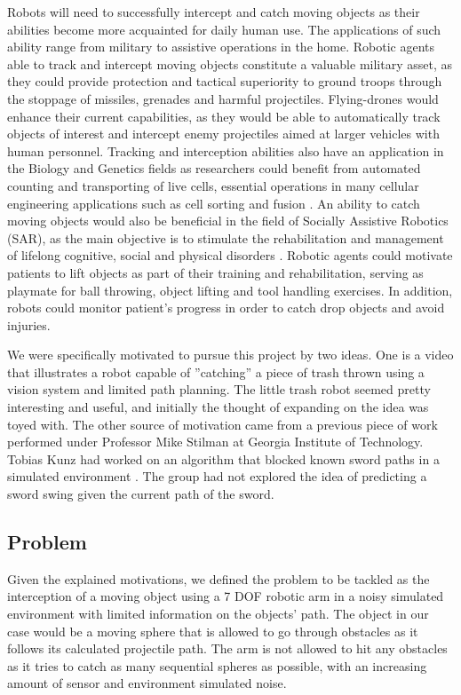 \documentclass[letterpaper, 10 pt, conference]{ieeeconf}  %
\begin{document}
Robots will need to successfully intercept and catch moving objects as their
abilities become more acquainted for daily human use. The applications of such
ability range from military to assistive operations in the home. Robotic agents
able to track and intercept moving objects constitute a valuable military
asset, as they could provide protection and tactical superiority to ground
troops through the stoppage of missiles, grenades and harmful projectiles.
Flying-drones would enhance their current capabilities, as they would be able
to automatically track objects of interest and intercept enemy projectiles
aimed at larger vehicles with human personnel.  Tracking and interception
abilities also have an application in the Biology and Genetics fields as
researchers could benefit from automated counting and transporting of live
cells, essential operations in many cellular engineering applications such as
cell sorting and fusion \cite{5985660}. An ability to catch moving objects
would also be beneficial in the field of Socially Assistive Robotics (SAR), as
the main objective is to stimulate the rehabilitation and management of
lifelong cognitive, social and physical disorders \cite{5569021}. Robotic
agents could motivate patients to lift objects as part of their training and
rehabilitation, serving as playmate for ball throwing, object lifting and tool
handling exercises. In addition, robots could monitor patient’s progress in
order to catch drop objects and avoid injuries.

We were specifically motivated to pursue this project by two ideas. One is a
video that illustrates a robot capable of ”catching” a piece of trash thrown
using a vision system and limited path planning. The little trash robot seemed
pretty interesting and useful, and initially the thought of expanding on the
idea was toyed with. The other source of motivation came from a previous piece
of work performed under Professor Mike Stilman at Georgia Institute of
Technology. Tobias Kunz had worked on an algorithm that blocked known sword
paths in a simulated environment \cite{lampariello2011trajectory}. The group
had not explored the idea of predicting a sword swing given the current path of
the sword.

\subsection{Problem}

Given the explained motivations, we defined the problem to be tackled as the
interception of a moving object using a 7 DOF robotic arm in a noisy simulated
environment with limited information on the objects’ path. The object in our
case would be a moving sphere that is allowed to go through obstacles as it
follows its calculated projectile path. The arm is not allowed to hit any
obstacles as it tries to catch as many sequential spheres as possible, with an
increasing amount of sensor and environment simulated noise.
\end{document}
